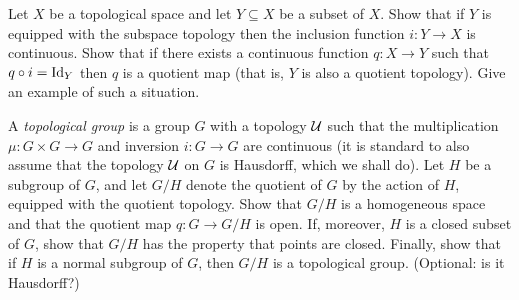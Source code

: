 \begin{exercise}
  Let \(X\) be a topological space and let \(Y\subseteq X\) be a subset of
  \(X\). Show that if \(Y\) is equipped with the subspace topology then the
  inclusion function \(i\colon Y\to X\) is continuous. Show that if
  there exists a continuous function \(q\colon X\to Y\) such that
  \(q\circ i=\operatorname{Id}_Y\) then \(q\) is a quotient map (that is, \(Y\) is also
  a quotient topology). Give an example of such a situation.
\end{exercise}
\begin{solution}
\end{solution}

\begin{exercise}
  A \emph{topological group} is a group \(G\) with a topology \(\mathcal{U}\)
  such that the multiplication \(\mu\colon G\times G\to G\) and inversion
  \(i\colon G\to G\) are continuous (it is standard to also assume that
  the topology \(\mathcal{U}\) on \(G\) is Hausdorff, which we shall do). Let
  \(H\) be a subgroup of \(G\), and let \(G/H\) denote the quotient of
  \(G\) by the action of \(H\), equipped with the quotient topology. Show
  that \(G/H\) is a homogeneous space and that the quotient map \(q\colon
  G\to G/H\) is open. If, moreover, \(H\) is a closed subset of \(G\), show
  that \(G/H\) has the property that points are closed. Finally, show that
  if \(H\) is a normal subgroup of \(G\), then \(G/H\) is a topological
  group. (Optional: is it Hausdorff?)
\end{exercise}
\begin{solution}
\end{solution}

